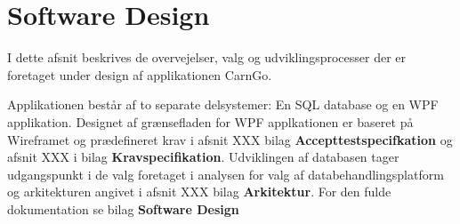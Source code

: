 \documentclass[Rapport/Rapport_main.tex]{subfiles}
\begin{document}
\section{Software Design}
I dette afsnit beskrives de overvejelser, valg og udviklingsprocesser der er foretaget under design af applikationen CarnGo.

Applikationen består af to separate delsystemer: En SQL database og en WPF applikation. Designet af grænsefladen for WPF applkationen er baseret på Wireframet og prædefineret krav i afsnit XXX bilag  \textbf{Accepttestspecifkation} og afsnit XXX i bilag \textbf{Kravspecifikation}. Udviklingen af databasen tager udgangspunkt i de valg foretaget i analysen for valg af databehandlingsplatform og arkitekturen angivet i afsnit XXX bilag \textbf{Arkitektur}. For den fulde dokumentation se bilag \textbf{Software Design}



\end{document}
